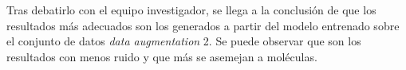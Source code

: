 \begin{figure}[H]
\centering
\end{figure}

Tras debatirlo con el equipo investigador, se llega a la conclusión de que los resultados más adecuados son los generados a partir del modelo entrenado sobre el conjunto de datos \textit{data augmentation} 2. Se puede observar que son los resultados con menos ruido y que más se asemejan a moléculas.


